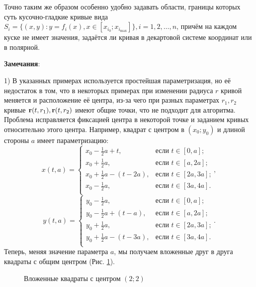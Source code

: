 \documentclass[a4paper]{article}
\begin{document}
Точно таким же образом особенно удобно задавать области, границы которых суть кусочно-гладкие кривые вида $S_i=\{(x,y): y=f_i(x), x \in [x_{i_0};x_{i_{\max}}]\}, i=1,2,\dots, n$, причём на каждом куске не имеет значения, задаётся ли кривая в декартовой системе координат или в полярной.

{\bf Замечания}:

  1) В указанных примерах используется простейшая параметризация, но её недостаток в том, что в некоторых примерах при изменении радиуса $r$ кривой меняется и расположение её центра, из-за чего при разных параметрах $r_1,r_2$ кривые ${\bf r}(t,r_1),{\bf r}(t,r_2)$ имеют общие точки, что не подходит для алгоритма.
        Проблема исправляется фиксацией центра в некоторой точке и заданием кривых относительно этого центра. Например, квадрат с центром в $(x_0;y_0)$ и длиной стороны $a$ имеет параметризацию:
        \[
          x(t,a) =
          \begin{cases}
            x_0-\frac{1}{2}a+t,      & \text{если $t \in [0,a]$;}   \\
            x_0+\frac{1}{2}a,        & \text{если $t \in [a,2a]$;}  \\
            x_0+\frac{1}{2}a-(t-2a), & \text{если $t \in [2a,3a]$;} \\
            x_0-\frac{1}{2}a,        & \text{если $t \in [3a,4a]$.} \\
          \end{cases},
        \]
        \[
          y(t,a) =
          \begin{cases}
            y_0-\frac{1}{2}a,        & \text{если $t \in [0,a]$;}   \\
            y_0-\frac{1}{2}a+(t-a),  & \text{если $t \in [a,2a]$;}  \\
            y_0+\frac{1}{2}a,        & \text{если $t \in [2a,3a]$;} \\
            y_0+\frac{1}{2}a-(t-3a), & \text{если $t \in [3a,4a]$.} \\
          \end{cases}.
        \]
        Теперь, меняя значение параметра $a$, мы получаем вложенные друг в друга квадраты с общим центром (Рис. \ref{rects}).
        \begin{figure}[h!]
          \noindent{}
          \caption{Вложенные квадраты с центром $(2;2)$}
          \label{rects}
        \end{figure}
\end{document}
